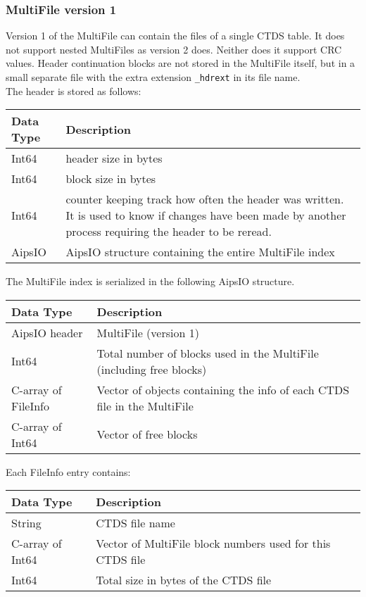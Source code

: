 \subsubsection{MultiFile version 1}
Version 1 of the MultiFile can contain the files of a single CTDS table.
It does not support nested MultiFiles as version 2 does. Neither does it
support CRC values. Header continuation blocks are not stored in the
MultiFile itself, but in a small separate file with the extra
extension \texttt{\_hdrext} in its file name.
\\The header is stored as follows:

\vspace{0.15in}
\begin{tabular}{|l|p{13cm}|} \hline
  Data Type & Description \\ \hline\hline
  Int64 & header size in bytes \\
  Int64 & block size in bytes \\
  Int64 & counter keeping track how often the header was written. It
          is used to know if changes have been made by another process
          requiring the header to be reread. \\
  AipsIO & AipsIO structure containing the entire MultiFile index \\
  \hline
\end{tabular}
\vspace{0.15in}

The MultiFile index is serialized in the following AipsIO structure.

\vspace{0.15in}
\begin{tabular}{|l|p{13cm}|} \hline
  Data Type & Description \\ \hline\hline
  AipsIO header & MultiFile (version 1) \\
  Int64 & Total number of blocks used in the MultiFile (including free blocks) \\
  C-array of FileInfo &  Vector of objects containing the info of each
                        CTDS file in the MultiFile \\
  C-array of Int64 & Vector of free blocks \\
  \hline
\end{tabular}
\vspace{0.15in}

Each FileInfo entry contains:

\vspace{0.15in}
\begin{tabular}{|l|p{13cm}|} \hline
  Data Type & Description \\ \hline\hline
  String & CTDS file name \\
  C-array of Int64 & Vector of MultiFile block numbers used for this CTDS file \\
  Int64 & Total size in bytes of the CTDS file \\
  \hline
\end{tabular}
\vspace{0.15in}


